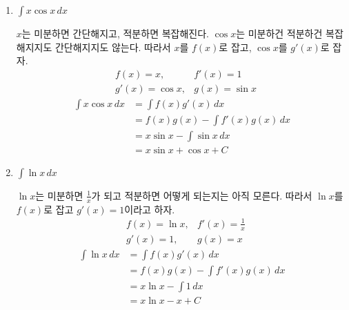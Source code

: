 \documentclass{oblivoir}
\newcounter{num}
\begin{document}
\begin{enumerate}
(참고) 만약 반대로 \(f(x)\)와 \(g'(x)\)를 잡았다면
\begin{align*}
&f(x)=e^x,		&f'(x)=e^x\\
&g'(x)=x+4,	&g(x)=\frac12x^2+4x
\end{align*}
\begin{align*}
\int(x+4)e^x\,dx
&=\int f(x)g'(x)\,dx\\
&=f(x)g(x)-\int f'(x)g(x)\,dx\\
&=\left(\frac12x^2+4x\right)e^x-\int\left(\frac12x^2+4x\right)e^x\,dx
\end{align*}
가 되어 오히려 더 복잡해졌을 것이다.
\clearpage
\item
\(\displaystyle\int x\cos x\,dx\)\par
\(x\)는 미분하면 간단해지고, 적분하면 복잡해진다.
\(\cos x\)는 미분하건 적분하건 복잡해지지도 간단해지지도 않는다.
따라서 \(x\)를 \(f(x)\)로 잡고, \(\cos x\)를 \(g'(x)\)로 잡자.
\begin{align*}
&f(x)=x,		&f'(x)=1\\
&g'(x)=\cos x,	&g(x)=\sin x
\end{align*}
\begin{align*}
\int x\cos x\,dx
&=\int f(x)g'(x)\,dx\\
&=f(x)g(x)-\int f'(x)g(x)\,dx\\
&=x\sin x-\int \sin x\,dx\\
&=x\sin x+\cos x+C
\end{align*}
\item
\(\displaystyle\int\ln x\,dx\)\par
\(\ln x\)는 미분하면 \(\frac1x\)가 되고 적분하면 어떻게 되는지는 아직 모른다.
따라서 \(\ln x\)를 \(f(x)\)로 잡고 \(g'(x)=1\)이라고 하자.
\begin{align*}
&f(x)=\ln x,		&f'(x)=\frac 1x\\
&g'(x)=1,			&g(x)=x
\end{align*}
\begin{align*}
\int \ln x\,dx
&=\int f(x)g'(x)\,dx\\
&=f(x)g(x)-\int f'(x)g(x)\,dx\\
&=x\ln x-\int1\,dx\\
&=x\ln x-x+C
\end{align*}
\end{enumerate}
\end{document}
